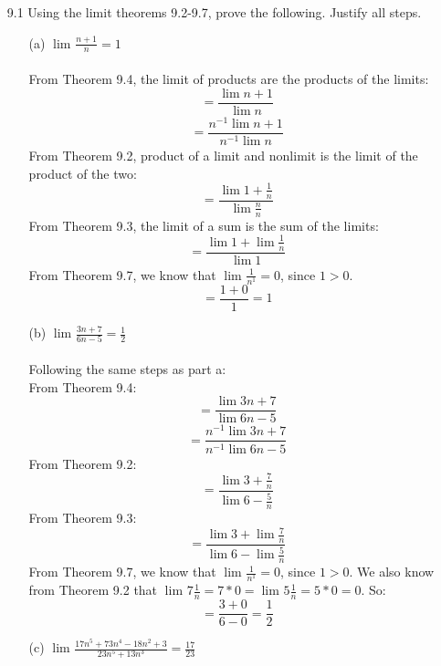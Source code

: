 
\usepackage{amsmath, dsfont}

\oddsidemargin 0in
\evensidemargin 0in
\textwidth 6.5in
\topmargin -0.5in
\textheight 9.0in
\newcommand{\norm}[1]{\left\lVert #1 \right\rVert}
\newcommand{\abs}[1]{\left\vert #1 \right\vert}
\newcommand{\?}{\stackrel{?}{=}}



\pagestyle{myheadings}

\begin{itemize}
  \item [9.1]
    Using the limit theorems 9.2-9.7, prove the following. Justify all steps.
    \begin{itemize}
      \item [(a)] $\lim_{} \frac{n+1}{n} = 1$\\\\

        From Theorem 9.4, the limit of products are the products of the limits:
        $$= \frac{\lim_{} n+1}{\lim_{} n}$$
        $$= \frac{n^{-1} \lim_{} n+1}{n^{-1} \lim_{} n}$$
        From Theorem 9.2, product of a limit and nonlimit is the limit of the product of the two:
        $$= \frac{\lim_{} 1 + \frac{1}{n} }{\lim_{} \frac{n}{n}}$$
        From Theorem 9.3, the limit of a sum is the sum of the limits:
        $$= \frac{\lim_{} 1 + \lim_{} \frac{1}{n}}{\lim_{} 1}$$
        From Theorem 9.7, we know that $\lim_{} \frac{1}{n^1} = 0$, since $1 > 0$.
        $$= \frac{1 + 0}{1} = 1$$

      \item [(b)] $\lim_{} \frac{3n+7}{6n-5} = \frac{1}{2}$\\\\
        Following the same steps as part a:\\

        From Theorem 9.4:
        $$= \frac{\lim_{} 3n+7}{\lim_{} 6n-5}$$
        $$= \frac{n^{-1} \lim_{} 3n+7}{n^{-1} \lim_{} 6n-5}$$
        From Theorem 9.2:
        $$= \frac{\lim_{} 3 + \frac{7}{n} }{\lim_{} 6 - \frac{5}{n} }$$
        From Theorem 9.3:
        $$= \frac{\lim_{} 3 + \lim_{} \frac{7}{n} }{\lim_{} 6 - \lim_{} \frac{5}{n}}$$
        From Theorem 9.7, we know that $\lim_{} \frac{1}{n^1} = 0$, since $1 > 0$. We also know from Theorem 9.2 that $\lim_{} 7 \frac{1}{n} = 7*0 = \lim_{} 5 \frac{1}{n} = 5*0 = 0$. So:
        $$= \frac{3 + 0}{6 - 0} = \frac{1}{2}$$

      \item [(c)] $\lim_{} \frac{17n^5 + 73n^4 - 18n^2 + 3}{23n^5 + 13n^3} = \frac{17}{23}$\\\\
        

\end{itemize}
\end{itemize}
